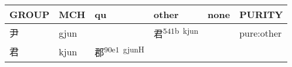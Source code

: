 \documentclass[14pt,a4paper]{scrartcl}
\begin{document}
\begin{longtable}[c]{@{}llllll@{}}
\toprule
\begin{minipage}[b]{0.14\columnwidth}\raggedright\strut
GROUP
\strut\end{minipage} &
\begin{minipage}[b]{0.14\columnwidth}\raggedright\strut
MCH
\strut\end{minipage} &
\begin{minipage}[b]{0.14\columnwidth}\raggedright\strut
qu
\strut\end{minipage} &
\begin{minipage}[b]{0.14\columnwidth}\raggedright\strut
other
\strut\end{minipage} &
\begin{minipage}[b]{0.14\columnwidth}\raggedright\strut
none
\strut\end{minipage} &
\begin{minipage}[b]{0.14\columnwidth}\raggedright\strut
PURITY
\strut\end{minipage}\tabularnewline
\midrule
\endhead
\begin{minipage}[t]{0.14\columnwidth}\raggedright\strut
尹
\strut\end{minipage} &
\begin{minipage}[t]{0.14\columnwidth}\raggedright\strut
gjun
\strut\end{minipage} &
\begin{minipage}[t]{0.14\columnwidth}\raggedright\strut
\strut\end{minipage} &
\begin{minipage}[t]{0.14\columnwidth}\raggedright\strut
君\textsuperscript{541b~kjun}
\strut\end{minipage} &
\begin{minipage}[t]{0.14\columnwidth}\raggedright\strut
\strut\end{minipage} &
\begin{minipage}[t]{0.14\columnwidth}\raggedright\strut
pure:other
\strut\end{minipage}\tabularnewline
\begin{minipage}[t]{0.14\columnwidth}\raggedright\strut
君
\strut\end{minipage} &
\begin{minipage}[t]{0.14\columnwidth}\raggedright\strut
kjun
\strut\end{minipage} &
\begin{minipage}[t]{0.14\columnwidth}\raggedright\strut
郡\textsuperscript{90e1~gjunH}
\strut\end{minipage} &

\end{longtable}
\end{document}
